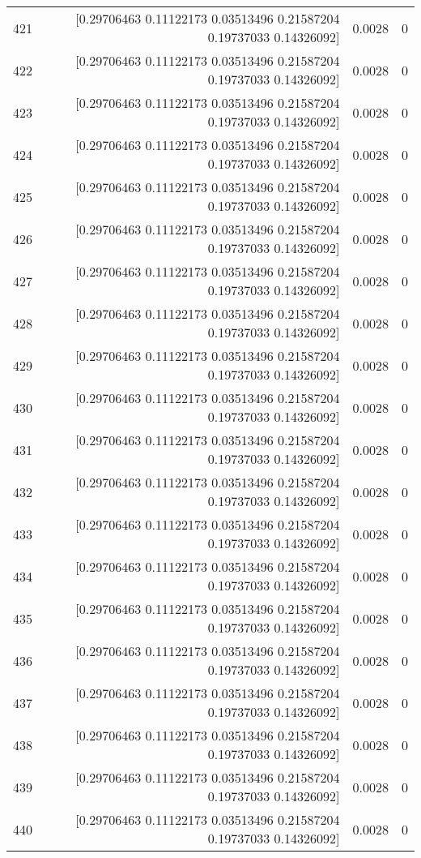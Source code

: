 \begin{longtable}{lrrr}
421 & [0.29706463 0.11122173 0.03513496 0.21587204 0.19737033 0.14326092] & 0.0028 & 0 \\
422 & [0.29706463 0.11122173 0.03513496 0.21587204 0.19737033 0.14326092] & 0.0028 & 0 \\
423 & [0.29706463 0.11122173 0.03513496 0.21587204 0.19737033 0.14326092] & 0.0028 & 0 \\
424 & [0.29706463 0.11122173 0.03513496 0.21587204 0.19737033 0.14326092] & 0.0028 & 0 \\
425 & [0.29706463 0.11122173 0.03513496 0.21587204 0.19737033 0.14326092] & 0.0028 & 0 \\
426 & [0.29706463 0.11122173 0.03513496 0.21587204 0.19737033 0.14326092] & 0.0028 & 0 \\
427 & [0.29706463 0.11122173 0.03513496 0.21587204 0.19737033 0.14326092] & 0.0028 & 0 \\
428 & [0.29706463 0.11122173 0.03513496 0.21587204 0.19737033 0.14326092] & 0.0028 & 0 \\
429 & [0.29706463 0.11122173 0.03513496 0.21587204 0.19737033 0.14326092] & 0.0028 & 0 \\
430 & [0.29706463 0.11122173 0.03513496 0.21587204 0.19737033 0.14326092] & 0.0028 & 0 \\
431 & [0.29706463 0.11122173 0.03513496 0.21587204 0.19737033 0.14326092] & 0.0028 & 0 \\
432 & [0.29706463 0.11122173 0.03513496 0.21587204 0.19737033 0.14326092] & 0.0028 & 0 \\
433 & [0.29706463 0.11122173 0.03513496 0.21587204 0.19737033 0.14326092] & 0.0028 & 0 \\
434 & [0.29706463 0.11122173 0.03513496 0.21587204 0.19737033 0.14326092] & 0.0028 & 0 \\
435 & [0.29706463 0.11122173 0.03513496 0.21587204 0.19737033 0.14326092] & 0.0028 & 0 \\
436 & [0.29706463 0.11122173 0.03513496 0.21587204 0.19737033 0.14326092] & 0.0028 & 0 \\
437 & [0.29706463 0.11122173 0.03513496 0.21587204 0.19737033 0.14326092] & 0.0028 & 0 \\
438 & [0.29706463 0.11122173 0.03513496 0.21587204 0.19737033 0.14326092] & 0.0028 & 0 \\
439 & [0.29706463 0.11122173 0.03513496 0.21587204 0.19737033 0.14326092] & 0.0028 & 0 \\
440 & [0.29706463 0.11122173 0.03513496 0.21587204 0.19737033 0.14326092] & 0.0028 & 0 \\

\end{longtable}

